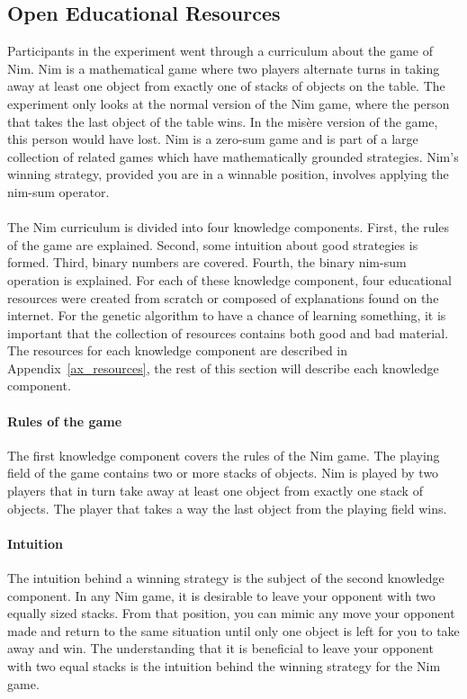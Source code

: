 \subsection{Open Educational Resources}
\label{sec:setup_material}
Participants in the experiment went through a curriculum about the game of Nim.
Nim \citep{Bouton1901} is a mathematical game where two players alternate turns
in taking away at least one object from exactly one of stacks of objects on the
table. The experiment only looks at the normal version of the Nim game, where
the person that takes the last object of the table wins. In the mis\`{e}re
version of the game, this person would have lost. Nim is a zero-sum game and is
part of a large collection of related games which have mathematically grounded
strategies. Nim's winning strategy, provided you are in a winnable position,
involves applying the nim-sum operator.\\\\
\noindent
The Nim curriculum is divided into four knowledge components. First, the rules
of the game are explained. Second, some intuition about good strategies is formed.
Third, binary numbers are covered. Fourth, the binary nim-sum operation is
explained. For each of these knowledge component, four educational resources
were created from scratch or composed of explanations found on the internet.
For the genetic algorithm to have a chance of learning something, it is
important that the collection of resources contains both good and bad material.
The resources for each knowledge component are described in
Appendix~\ref{ax_resources}, the rest of this section will describe
each knowledge component.
\paragraph{Rules of the game} The first knowledge component covers the rules
of the Nim game. The playing field of the game contains two or more stacks of
objects. Nim is played by two players that in turn take away at least
one object from exactly one stack of objects. The player that takes a way the
last object from the playing field wins.
\paragraph{Intuition} The intuition behind a winning strategy is the subject
of the second knowledge component. In any Nim game, it is desirable to leave
your opponent with two equally sized stacks. From that position, you can mimic
any move your opponent made and return to the same situation until only one
object is left for you to take away and win. The understanding that it is
beneficial to leave your opponent with two equal stacks is the intuition behind
the winning strategy for the Nim game.
